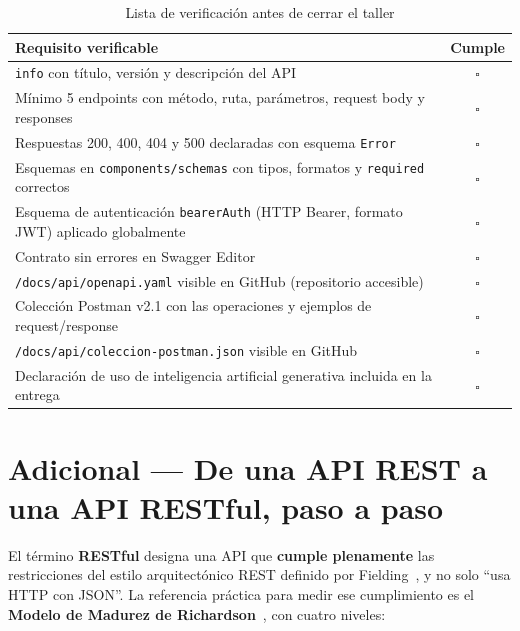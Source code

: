 \documentclass[11pt,a4paper]{article}
\begin{document}
\begin{table}[h!]
\centering
\caption{Lista de verificación antes de cerrar el taller}
\small
\begin{tabular}{p{12.5cm} c}
\toprule
\textbf{Requisito verificable} & \textbf{Cumple} \\
\midrule
\texttt{info} con título, versión y descripción del API & $\square$ \\
Mínimo 5 endpoints con método, ruta, parámetros, request body y responses & $\square$ \\
Respuestas 200, 400, 404 y 500 declaradas con esquema \texttt{Error} & $\square$ \\
Esquemas en \texttt{components/schemas} con tipos, formatos y \texttt{required} correctos & $\square$ \\
Esquema de autenticación \texttt{bearerAuth} (HTTP Bearer, formato JWT) aplicado globalmente & $\square$ \\
Contrato sin errores en Swagger Editor & $\square$ \\
\texttt{/docs/api/openapi.yaml} visible en GitHub (repositorio accesible) & $\square$ \\
Colección Postman v2.1 con las operaciones y ejemplos de request/response & $\square$ \\
\texttt{/docs/api/coleccion-postman.json} visible en GitHub & $\square$ \\
Declaración de uso de inteligencia artificial generativa incluida en la entrega & $\square$ \\
\bottomrule
\end{tabular}
\end{table}

\section{Adicional --- De una API REST a una API RESTful, paso a paso}

El término \textbf{RESTful} designa una API que \textbf{cumple plenamente} las restricciones del estilo arquitectónico REST definido por Fielding~\cite{fielding2000}, y no solo ``usa HTTP con JSON''. La referencia práctica para medir ese cumplimiento es el \textbf{Modelo de Madurez de Richardson}~\cite{fowler2010}, con cuatro niveles:
\end{document}
